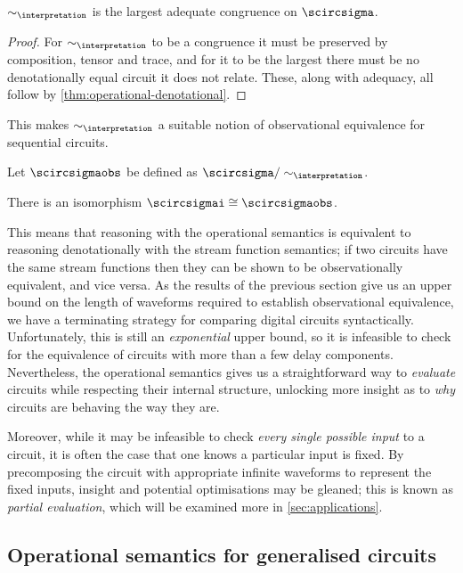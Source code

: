\documentclass{lmcs}
\begin{document}
\begin{cor}
    \(\sim_\interpretation\) is the largest adequate congruence on
    \(\scircsigma\).
\end{cor}
\begin{proof}
    For \(\sim_\interpretation\) to be a congruence it must be preserved by
    composition, tensor and trace, and for it to be the largest there must be
    no denotationally equal circuit it does not relate.
    These, along with adequacy, all follow by
    \autoref{thm:operational-denotational}.
\end{proof}

This makes \(\sim_\interpretation\) a suitable notion of observational
equivalence for sequential circuits.

\begin{defi}
    Let \(\scircsigmaobs\) be defined as
    \(\scircsigma / \sim_{\interpretation}\).
\end{defi}

\begin{cor}
    There is an isomorphism \(\scircsigmai \cong \scircsigmaobs\).
\end{cor}

This means that reasoning with the operational semantics is equivalent to
reasoning denotationally with the stream function semantics; if two circuits
have the same stream functions then they can be shown to be observationally
equivalent, and vice versa.
As the results of the previous section give us an upper bound on the length of
waveforms required to establish observational equivalence, we have a
terminating strategy for comparing digital circuits syntactically.
Unfortunately, this is still an \emph{exponential} upper bound, so it is
infeasible to check for the equivalence of circuits with more than a few delay
components.
Nevertheless, the operational semantics gives us a straightforward way to
\emph{evaluate} circuits while respecting their internal structure, unlocking
more insight as to \emph{why} circuits are behaving the way they are.

Moreover, while it may be infeasible to check \emph{every single possible input}
to a circuit, it is often the case that one knows a particular input is fixed.
By precomposing the circuit with appropriate infinite waveforms to represent the
fixed inputs, insight and potential optimisations may be gleaned; this is known
as \emph{partial evaluation}, which will be examined more
in \autoref{sec:applications}.

\subsection{Operational semantics for generalised circuits}
\end{document}
